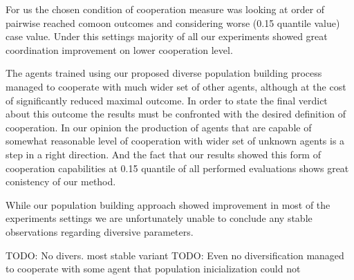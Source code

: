 For us the chosen condition of cooperation measure was looking at order of pairwise reached comoon outcomes and considering worse (0.15 quantile value) case value.
Under this settings majority of all our experiments showed great coordination improvement on lower cooperation level.

The agents trained using our proposed diverse population building process managed to cooperate with much wider set of other agents, although at the cost of significantly reduced maximal outcome.
In order to state the final verdict about this outcome the results must be confronted with the desired definition of cooperation.
In our opinion the production of agents that are capable of somewhat reasonable level of cooperation with wider set of unknown agents is a step in a right direction.
And the fact that our results showed this form of cooperation capabilities at 0.15 quantile of all performed evaluations shows great conistency of our method.

While our population building approach showed improvement in most of the experiments settings we are unfortunately unable to conclude any stable observations regarding diversive parameters.

{\color{blue}TODO: No divers. most stable variant}
{\color{blue}TODO: Even no diversification managed to cooperate with some agent that population inicialization could not}

 















